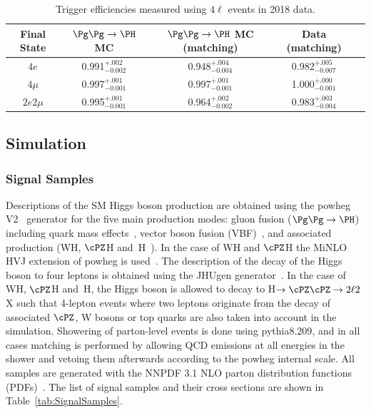 \begin{table}[h]
	\centering
	\begin{tabular}{|c|c|c|c|c|} 
		\hline %
		Final State  & $\ggH$ MC & $\ggH$ MC (matching)  & Data (matching)   \\
		\hline %
		$4e$  & 0.991$^{+.002}_{-0.002}$ & 0.948$^{+.004}_{-0.004}$ & 0.982$^{+.005}_{-0.007}$ \\
		$4\mu$  & 0.997$^{+.001}_{-0.001}$ & 0.997$^{+.001}_{-0.001}$ & 1.000$^{+.000}_{-0.001}$ \\
		$2e2\mu$  & 0.995$^{+.001}_{-0.001}$ & 0.964$^{+.002}_{-0.002}$ & 0.983$^{+.003}_{-0.004}$ \\
		\hline %
	\end{tabular}
	\caption{Trigger efficiencies measured using $4\ell$ events in 2018 data.}
	\label{tab:TrigEffC}
\end{table}

\subsection{Simulation}

\subsubsection{Signal Samples}

Descriptions of the SM Higgs boson production are obtained using the 
{\sc powheg V2}~\cite{Alioli:2008gx,Nason:2004rx,Frixione:2007vw} generator for the five main production modes: 
gluon fusion ($\ggH$) including quark mass effects~\cite{Bagnaschi:2011tu}, vector boson fusion 
(VBF)~\cite{Nason:2009ai}, and associated production (WH, $\cPZ$H and \ttbar$\,$H~\cite{Hartanto:2015uka}). 
In the case of WH and $\cPZ$H the {\sc MiNLO HVJ} extension of {\sc powheg} is used~\cite{Luisoni:2013kna}. 
The description of the decay of the Higgs boson to four leptons is obtained using the {\sc JHUgen} 
generator~\cite{Gao:2010qx}. In the case of WH, $\cPZ$H and \ttbar$\,$H, the Higgs boson is allowed
to decay to H$\to \cPZ \cPZ \to 2\ell2$X such that 4-lepton events where two leptons originate from 
the decay of associated $\cPZ$, W bosons or top quarks are also taken into account in the simulation. 
Showering of parton-level events is done using {\sc pythia8.209}, and in all cases matching is performed by 
allowing QCD emissions at all energies in the shower and vetoing them afterwards according to the 
{\sc powheg} internal scale. All samples are generated with the NNPDF 3.1 NLO parton distribution 
functions (PDFs)~\cite{Ball:2014uwa}. The list of signal samples and their cross sections are shown in 
Table~\ref{tab:SignalSamples}.

